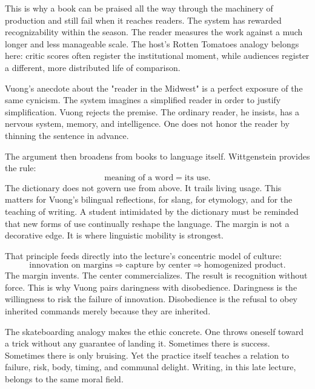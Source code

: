 This is why a book can be praised all the way through the machinery of production and still fail when it reaches readers. The system has rewarded recognizability within the season. The reader measures the work against a much longer and less manageable scale. The host's Rotten Tomatoes analogy belongs here: critic scores often register the institutional moment, while audiences register a different, more distributed life of comparison.

Vuong's anecdote about the "reader in the Midwest" is a perfect exposure of the same cynicism. The system imagines a simplified reader in order to justify simplification. Vuong rejects the premise. The ordinary reader, he insists, has a nervous system, memory, and intelligence. One does not honor the reader by thinning the sentence in advance.

The argument then broadens from books to language itself. Wittgenstein provides the rule:
\begin{equation}
\text{meaning of a word} = \text{its use}.
\end{equation}
The dictionary does not govern use from above. It trails living usage. This matters for Vuong's bilingual reflections, for slang, for etymology, and for the teaching of writing. A student intimidated by the dictionary must be reminded that new forms of use continually reshape the language. The margin is not a decorative edge. It is where linguistic mobility is strongest.

That principle feeds directly into the lecture's concentric model of culture:
\begin{equation}
\text{innovation on margins} \Longrightarrow \text{capture by center} \Longrightarrow \text{homogenized product}.
\end{equation}
The margin invents. The center commercializes. The result is recognition without force. This is why Vuong pairs daringness with disobedience. Daringness is the willingness to risk the failure of innovation. Disobedience is the refusal to obey inherited commands merely because they are inherited.

The skateboarding analogy makes the ethic concrete. One throws oneself toward a trick without any guarantee of landing it. Sometimes there is success. Sometimes there is only bruising. Yet the practice itself teaches a relation to failure, risk, body, timing, and communal delight. Writing, in this late lecture, belongs to the same moral field.

